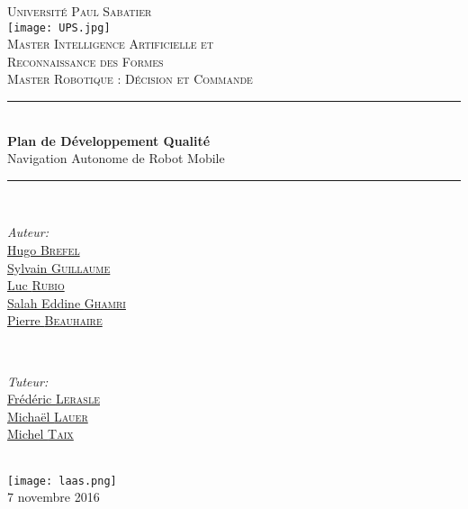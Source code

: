 \documentclass[10pt,a4paper]{article}
\begin{document}
\pagestyle {plain}

\begin{titlepage}


\newcommand{\HRule}{\rule{\linewidth}{0.5mm}} 

\center

\textsc{\Large Université Paul Sabatier}\\[1cm] 
\texttt{[image: UPS.jpg]}\\[0.6cm] 


\textsc{Master Intelligence Artificielle et \\ 
Reconnaissance des Formes \\ Master Robotique : Décision et Commande}\\[3cm] 

\HRule \\[0.4cm]
{ \huge \bfseries Plan de Développement Qualité}\\[0.4cm] 
\LARGE Navigation Autonome de Robot Mobile

\HRule \\[1.5cm]
 

\begin{minipage}{0.4\textwidth}
\begin{flushleft} \large
\emph{Auteur:}\\
\href{mailto:brefel.hugo@gmail.com}{Hugo \textsc{Brefel} }  \\
\href{mailto:sylvain31g@free.fr}{Sylvain \textsc{Guillaume} } \\
\href{mailto:luc.rubio.lr@gmail.com}{Luc \textsc{Rubio} } \\
\href{mailto:salaheddineghamri@gmail.com}{Salah Eddine \textsc{Ghamri} } \\
\href{mailto:beauhaire.pierre@gmail.com}{Pierre \textsc{Beauhaire} }  
\end{flushleft}
\end{minipage}
~
\begin{minipage}{0.4\textwidth}
\begin{flushright} \large
\emph{Tuteur:} \\
\href{mailto:lerasle@laas.fr}{Frédéric \textsc{Lerasle}}\\
\href{mailto:michael.lauer@laas.fr}{Michaël \textsc{Lauer}} \\
\href{mailto:taix@laas.f}{Michel \textsc{Taix}}
\end{flushright}
\end{minipage}\\[5cm]

\texttt{[image: laas.png]} \\[1.1cm] 

\large 7 novembre 2016
 

\end{titlepage}
\end{document}
